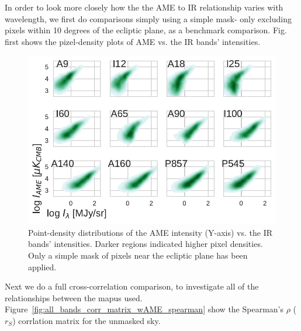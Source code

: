         In order to look more closely how the the AME to IR relationship varies with wavelength, we first do comparisons simply using a simple mask- only excluding pixels within 10 degrees of the ecliptic plane, as a benchmark comparison. Fig. first shows the pizel-density plots of AME vs. the IR bands' intensities.
        \begin{figure}
          \includegraphics[width=\textwidth]{../Plots/ch_allsky/AMEvsDust_allsky_allbands_mpsub_kde_unmasked.pdf}
          \centering
          \caption{Point-density distributions of the AME intensity (Y-axis) vs. the IR bands' intensities. Darker regions indicated higher pixel densities. Only a simple mask of pixels near the ecliptic plane has been applied.}
          \label{fig:AMEvsDust_allsky_allbands_mpsub_kde_unmasked}
        \end{figure}
        Next we do a full cross-correlation comparison, to investigate all of the relationships between the mapus used. Figure~\ref{fig:all_bands_corr_matrix_wAME_spearman} show the Spearman's $\rho$ ($r_{S}$) corrlation matrix for the unmasked sky.
